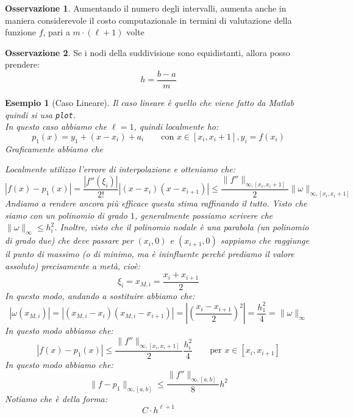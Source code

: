 \documentclass[11pt,a4paper,twoside]{article}
\newtheorem{es}{Esempio}
\theoremstyle{definition}
\newtheorem*{oss}{Osservazione}
\begin{document}
\begin{oss}
	Aumentando il numero degli intervalli, aumenta anche in maniera considerevole il costo computazionale in termini di valutazione della funzione $f$, pari a $m\cdot (\ell +1)$ volte
\end{oss}

\begin{oss}
	Se i nodi della suddivisione sono equidistanti, allora posso prendere:
	\[ h = \frac{b-a}m \]
\end{oss}

\begin{es}[Caso Lineare]\label{lineare}
	Il caso lineare è quello che viene fatto da Matlab quindi si usa \texttt{plot}.\\
	In questo caso abbiamo che $\ell =1$, quindi localmente ho:
	\[ p_1(x) = y_1 + (x-x_i) + a_i\qquad \text{con }x \in [x_i,x_i+1], y_i = f(x_i) \]
	Graficamente abbiamo che
	\begin{center}
	\end{center}
	Localmente utilizzo l'errore di interpolazione e otteniamo che:
	\[ |f(x)-p_1(x)| = \frac{|f''(\xi_i)|}{2!}|(x-x_i)(x-x_{i+1})| \leq \frac{\|f''\|_{\infty, [x_i, x_i+1]}}{2}\|\omega\|_{\infty, [x_i,x_i+1]}\]
	Andiamo a rendere ancora più efficace questa stima raffinando il tutto. Visto che siamo con un polinomio di grado $1$, generalmente possiamo scrivere che $\|\omega\|_\infty \leq h_i^2$. Inoltre, visto che il polinomio nodale è una parabola (un polinomio di grado due) che deve passare per $(x_i,0)$ e $(x_{i+1}, 0)$ sappiamo che raggiunge il punto di massimo (o di minimo, ma è ininfluente perché prediamo il valore assoluto) precisamente a metà, cioè:
	\[ \xi_i = x_{M, i} = \frac{x_i + x_{i+1}}2 \]
	In questo modo, andando a sostituire abbiamo che:
	\[ |\omega(x_{M, i})| = |(x_{M, i}-x_i)(x_{M, i}- x_{i+1})| = \left|\left( \frac {x_i - x_{i+1}}2 \right)^2\right| = \frac{h_1^2}4 = \|\omega\|_\infty\]
	In questo modo abbiamo che:
	\[ |f(x) - p_1(x)| \leq \frac{\|f''\|_{\infty, [x_i, x_i+1]}}2 \frac{h_i^2}4\qquad \text{per }x \in [x_i, x_{i+1}] \]
	In questo modo abbiamo che:
	\[ \|f-p_1\|_{\infty, [a,b]} \leq \frac{\|f''\|_{\infty, [a,b]}}{8}h^2 \]
	Notiamo che è della forma:
	\[ C \cdot h^{\ell + 1} \]
\end{es}
\end{document}
